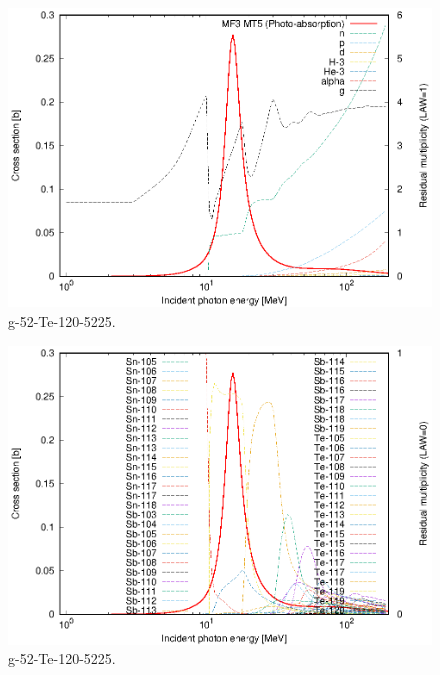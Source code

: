 \begin{figure}
 \includegraphics[width=\linewidth]{eps/g_52-Te-120_5225.eps}
  \caption{g-52-Te-120-5225.}
\end{figure}
\begin{figure}
 \includegraphics[width=\linewidth]{eps-law0/g_52-Te-120_5225.eps}
 \caption{g-52-Te-120-5225.}
\end{figure}
\newpage \clearpage

